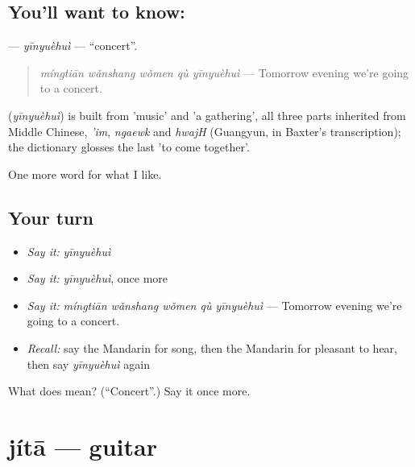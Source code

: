 \subsection*{You'll want to know: }
\textbf{} — \emph{yīnyuèhuì} — \textquotedblleft{}concert\textquotedblright{}.

\begin{quote}
\textbf{} \emph{míngtiān wǎnshang wǒmen qù yīnyuèhuì} — Tomorrow evening we're going to a concert.
\end{quote}

\begin{cousinweb}
\textbf{} (\emph{yīnyuèhuì}) is built from  'music' and  'a gathering', all three parts inherited from Middle Chinese, \emph{'im}, \emph{ngaewk} and \emph{hwajH} (Guangyun, in Baxter's transcription); the dictionary glosses the last 'to come together'.
\end{cousinweb}

\begin{grammarlens}[title={What you've built}]
One more word for what I like.
\end{grammarlens}

\subsection*{Your turn}
\begin{itemize}
\raggedright
  \item \emph{Say it:} \emph{yīnyuèhuì}
  \item \emph{Say it:} \emph{yīnyuèhuì}, once more
  \item \emph{Say it:} \emph{míngtiān wǎnshang wǒmen qù yīnyuèhuì} — Tomorrow evening we're going to a concert.
  \item \emph{Recall:} say the Mandarin for song, then the Mandarin for pleasant to hear, then say \emph{yīnyuèhuì} again
\end{itemize}

\begin{tcolorbox}[breakable,colback=teal!4,colframe=teal!35!black,title={Before you move on}]
What does  mean? (\textquotedblleft{}Concert\textquotedblright{}.) Say it once more.
\end{tcolorbox}
\section[jítā]{jítā — guitar}

